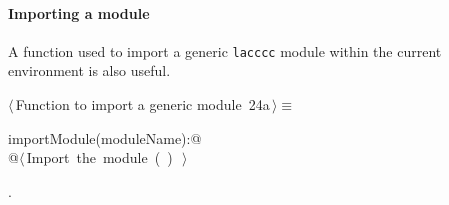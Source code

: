 \documentclass[11pt,oneside]{article}	%
\begin{document}
\paragraph{Importing a module} A function used to import a generic \texttt{lacccc} module within the current environment is also useful.
\begin{flushleft} \small
\begin{minipage}{\linewidth} \label{scrap43}
\protect{}$\langle\,$Function to import a generic module\nobreak\ {\footnotesize 24a}$\,\rangle\equiv$
\vspace{-1ex}
\begin{list}{}{} \item
\mbox{}\verb@def importModule(moduleName):@\\
\mbox{}\verb@   @\hbox{$\langle\,$Import the module\nobreak\ ({\footnotesize {}\label{scrap44}
 }\mbox{}\verb@moduleName@ ) {\footnotesize {}}$\,\rangle$}\verb@@\\
\mbox{}\verb@@{\NWsep}
\end{list}
\vspace{-1ex}
\footnotesize\addtolength{\baselineskip}{-1ex}
\begin{list}{}{\setlength{\itemsep}{-\parsep}\setlength{\itemindent}{-\leftmargin}}
\item {\NWtxtMacroNoRef}.
\end{list}
\end{minipage}\\[4ex]
\end{flushleft}






\end{document}
